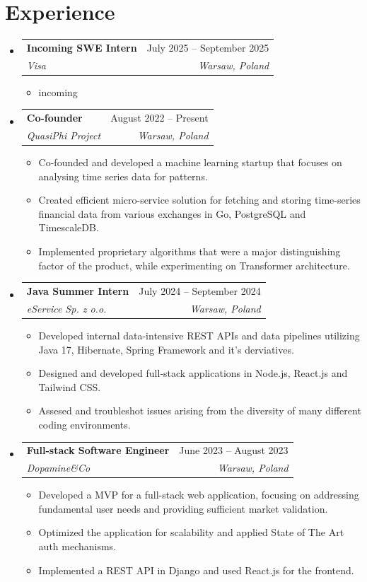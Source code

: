 \documentclass[letterpaper,11pt]{article}
\makeatletter
\newcommand{\resumeItem}[1]{
  \item\small{
    {#1 \vspace{-2pt}}
  }
}
\newcommand{\resumeSubheading}[4]{
  \vspace{-2pt}\item
    \begin{tabular*}{0.97\textwidth}[t]{l@{\extracolsep{\fill}}r}
      \textbf{#1} & #2 \\
      \textit{\small#3} & \textit{\small #4} \\
    \end{tabular*}\vspace{-7pt}
}
\newcommand{\resumeSubHeadingListStart}{\begin{itemize}[leftmargin=0.15in, label={}]}
\newcommand{\resumeSubHeadingListEnd}{\end{itemize}}
\newcommand{\resumeItemListStart}{\begin{itemize}}
\newcommand{\resumeItemListEnd}{\end{itemize}\vspace{-5pt}}
\makeatother
\begin{document}
\section{Experience}
  \resumeSubHeadingListStart
    \resumeSubheading
      {Incoming SWE Intern}{July 2025 -- September 2025}
      {Visa}{Warsaw, Poland}
      \resumeItemListStart
        \resumeItem{incoming}
      \resumeItemListEnd
    \resumeSubheading
      {Co-founder}{August 2022 -- Present}
      {QuasiPhi Project}{Warsaw, Poland}
      \resumeItemListStart
        \resumeItem{Co-founded and developed a machine learning startup that focuses on analysing time series data for patterns.}
        \resumeItem{Created efficient micro-service solution for fetching and storing time-series financial data from various exchanges in Go, PostgreSQL and TimescaleDB.}
        \resumeItem{Implemented proprietary algorithms that were a major distinguishing factor of the product, while experimenting on Transformer architecture.}
      \resumeItemListEnd
    \resumeSubheading
      {Java Summer Intern}{July 2024 -- September 2024}
      {eService Sp. z o.o.}{Warsaw, Poland}
      \resumeItemListStart
        \resumeItem{Developed internal data-intensive REST APIs and data pipelines utilizing Java 17, Hibernate, Spring Framework and it's derviatives.}
        \resumeItem{Designed and developed full-stack applications in Node.js, React.js and Tailwind CSS.}
        \resumeItem{Assesed and troubleshot issues arising from the diversity of many different coding environments.}
      \resumeItemListEnd
    \resumeSubheading
      {Full-stack Software Engineer}{June 2023 -- August 2023}
      {Dopamine\&Co}{Warsaw, Poland}
      \resumeItemListStart
        \resumeItem{Developed a MVP for a full-stack web application, focusing on addressing fundamental user needs and providing sufficient market validation.}
        \resumeItem{Optimized the application for scalability and applied State of The Art auth mechanisms.}
        \resumeItem{Implemented a REST API in Django and used React.js for the frontend.}
      \resumeItemListEnd
  \resumeSubHeadingListEnd
\end{document}
